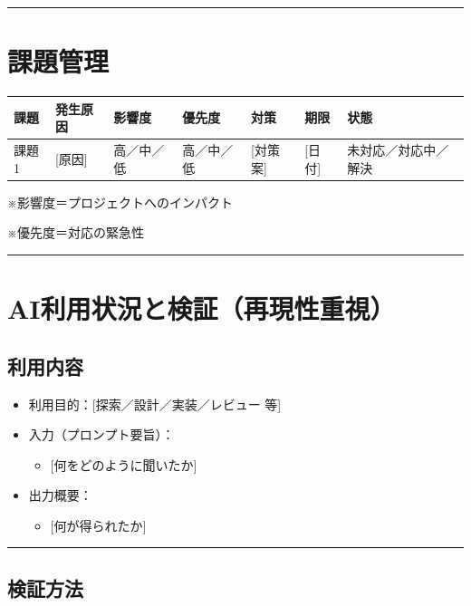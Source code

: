 \documentclass[uplatex,dvipdfmx,a4paper,11pt]{jsarticle}
\newcommand{\sectionrule}{\par\medskip\noindent\rule{\linewidth}{0.6pt}\par\medskip}
\begin{document}
\sectionrule

\section{課題管理}

\begin{tabularx}{\linewidth}{@{}lXllXll@{}}
\toprule
課題 & 発生原因 & 影響度 & 優先度 & 対策 & 期限 & 状態 \\
\midrule
課題1 & [原因] & 高／中／低 & 高／中／低 & [対策案] & [日付] & 未対応／対応中／解決 \\
\bottomrule
\end{tabularx}

\medskip
※影響度＝プロジェクトへのインパクト

※優先度＝対応の緊急性

\sectionrule

\section{AI利用状況と検証（再現性重視）}

\subsection{利用内容}

\begin{itemize}
  \item 利用目的：[探索／設計／実装／レビュー 等]
  \item 入力（プロンプト要旨）：
    \begin{itemize}
      \item {}[何をどのように聞いたか]
    \end{itemize}
  \item 出力概要：
    \begin{itemize}
      \item {}[何が得られたか]
    \end{itemize}
\end{itemize}

\sectionrule

\subsection{検証方法}
\end{document}
